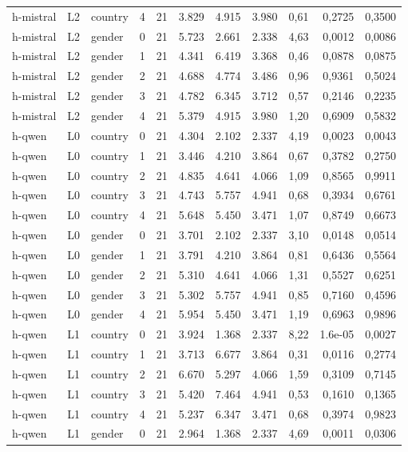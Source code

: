 \begin{landscape}
\begin{longtable}{lllrrrrrrrr}
h-mistral & L2 & country & 4 & 21 & 3.829 & 4.915 & 3.980 & 0,61 & 0,2725 & 0,3500 \\
h-mistral & L2 & gender & 0 & 21 & 5.723 & 2.661 & 2.338 & 4,63 & 0,0012 & 0,0086 \\
h-mistral & L2 & gender & 1 & 21 & 4.341 & 6.419 & 3.368 & 0,46 & 0,0878 & 0,0875 \\
h-mistral & L2 & gender & 2 & 21 & 4.688 & 4.774 & 3.486 & 0,96 & 0,9361 & 0,5024 \\
h-mistral & L2 & gender & 3 & 21 & 4.782 & 6.345 & 3.712 & 0,57 & 0,2146 & 0,2235 \\
h-mistral & L2 & gender & 4 & 21 & 5.379 & 4.915 & 3.980 & 1,20 & 0,6909 & 0,5832 \\
h-qwen & L0 & country & 0 & 21 & 4.304 & 2.102 & 2.337 & 4,19 & 0,0023 & 0,0043 \\
h-qwen & L0 & country & 1 & 21 & 3.446 & 4.210 & 3.864 & 0,67 & 0,3782 & 0,2750 \\
h-qwen & L0 & country & 2 & 21 & 4.835 & 4.641 & 4.066 & 1,09 & 0,8565 & 0,9911 \\
h-qwen & L0 & country & 3 & 21 & 4.743 & 5.757 & 4.941 & 0,68 & 0,3934 & 0,6761 \\
h-qwen & L0 & country & 4 & 21 & 5.648 & 5.450 & 3.471 & 1,07 & 0,8749 & 0,6673 \\
h-qwen & L0 & gender & 0 & 21 & 3.701 & 2.102 & 2.337 & 3,10 & 0,0148 & 0,0514 \\
h-qwen & L0 & gender & 1 & 21 & 3.791 & 4.210 & 3.864 & 0,81 & 0,6436 & 0,5564 \\
h-qwen & L0 & gender & 2 & 21 & 5.310 & 4.641 & 4.066 & 1,31 & 0,5527 & 0,6251 \\
h-qwen & L0 & gender & 3 & 21 & 5.302 & 5.757 & 4.941 & 0,85 & 0,7160 & 0,4596 \\
h-qwen & L0 & gender & 4 & 21 & 5.954 & 5.450 & 3.471 & 1,19 & 0,6963 & 0,9896 \\
h-qwen & L1 & country & 0 & 21 & 3.924 & 1.368 & 2.337 & 8,22 & 1.6e-05 & 0,0027 \\
h-qwen & L1 & country & 1 & 21 & 3.713 & 6.677 & 3.864 & 0,31 & 0,0116 & 0,2774 \\
h-qwen & L1 & country & 2 & 21 & 6.670 & 5.297 & 4.066 & 1,59 & 0,3109 & 0,7145 \\
h-qwen & L1 & country & 3 & 21 & 5.420 & 7.464 & 4.941 & 0,53 & 0,1610 & 0,1365 \\
h-qwen & L1 & country & 4 & 21 & 5.237 & 6.347 & 3.471 & 0,68 & 0,3974 & 0,9823 \\
h-qwen & L1 & gender & 0 & 21 & 2.964 & 1.368 & 2.337 & 4,69 & 0,0011 & 0,0306 \\

\end{longtable}
\end{landscape}
